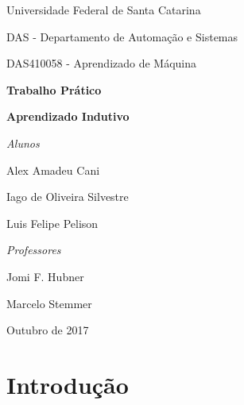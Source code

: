 \documentclass [12pt, a4paper] {article}
\begin{document}
\begin{titlepage}




	\centering
	{\Large Universidade Federal de Santa Catarina \par}
    {\Large DAS - Departamento de Automação e Sistemas \par}
	{\Large DAS410058 - Aprendizado de Máquina \par}
	\vspace{4cm}
	{\Huge\bfseries Trabalho Prático\par}
	\vspace{0.5cm}
	{\bfseries {\huge Aprendizado Indutivo}\par}
	\vspace{4cm}
	\emph{Alunos}\par
	{\large Alex Amadeu Cani \par}
    {\large Iago de Oliveira Silvestre\par}
	{\large Luis Felipe Pelison\par}

	\vspace{1.3cm}
	\emph{Professores}\par
	{\large Jomi F. Hubner \par}
    {\large  Marcelo Stemmer\par}
	

	\vfill
	{\large Outubro de 2017\par}
\end{titlepage}
\tableofcontents

\newpage





















\section{Introdução}
\end{document}
